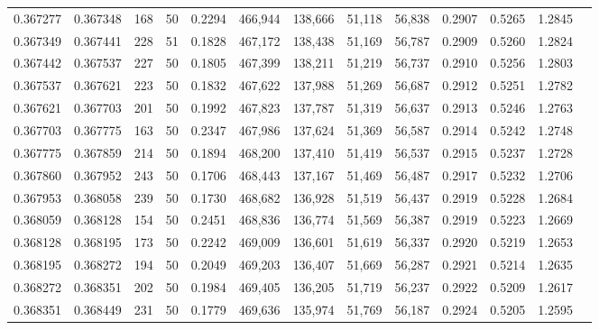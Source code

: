 \begin{tabular}{rrrrrrrrrrrrr}
0.367277 & 0.367348 &   168 &  50 &                                     0.2294 & 466,944 & 138,666 &  51,118 &  56,838 & 0.2907 & 0.5265 & 1.2845 \\
0.367349 & 0.367441 &   228 &  51 &                                     0.1828 & 467,172 & 138,438 &  51,169 &  56,787 & 0.2909 & 0.5260 & 1.2824 \\
0.367442 & 0.367537 &   227 &  50 &                                     0.1805 & 467,399 & 138,211 &  51,219 &  56,737 & 0.2910 & 0.5256 & 1.2803 \\
0.367537 & 0.367621 &   223 &  50 &                                     0.1832 & 467,622 & 137,988 &  51,269 &  56,687 & 0.2912 & 0.5251 & 1.2782 \\
0.367621 & 0.367703 &   201 &  50 &                                     0.1992 & 467,823 & 137,787 &  51,319 &  56,637 & 0.2913 & 0.5246 & 1.2763 \\
0.367703 & 0.367775 &   163 &  50 &                                     0.2347 & 467,986 & 137,624 &  51,369 &  56,587 & 0.2914 & 0.5242 & 1.2748 \\
0.367775 & 0.367859 &   214 &  50 &                                     0.1894 & 468,200 & 137,410 &  51,419 &  56,537 & 0.2915 & 0.5237 & 1.2728 \\
0.367860 & 0.367952 &   243 &  50 &                                     0.1706 & 468,443 & 137,167 &  51,469 &  56,487 & 0.2917 & 0.5232 & 1.2706 \\
0.367953 & 0.368058 &   239 &  50 &                                     0.1730 & 468,682 & 136,928 &  51,519 &  56,437 & 0.2919 & 0.5228 & 1.2684 \\
0.368059 & 0.368128 &   154 &  50 &                                     0.2451 & 468,836 & 136,774 &  51,569 &  56,387 & 0.2919 & 0.5223 & 1.2669 \\
0.368128 & 0.368195 &   173 &  50 &                                     0.2242 & 469,009 & 136,601 &  51,619 &  56,337 & 0.2920 & 0.5219 & 1.2653 \\
0.368195 & 0.368272 &   194 &  50 &                                     0.2049 & 469,203 & 136,407 &  51,669 &  56,287 & 0.2921 & 0.5214 & 1.2635 \\
0.368272 & 0.368351 &   202 &  50 &                                     0.1984 & 469,405 & 136,205 &  51,719 &  56,237 & 0.2922 & 0.5209 & 1.2617 \\
0.368351 & 0.368449 &   231 &  50 &                                     0.1779 & 469,636 & 135,974 &  51,769 &  56,187 & 0.2924 & 0.5205 & 1.2595 \\

\end{tabular}
